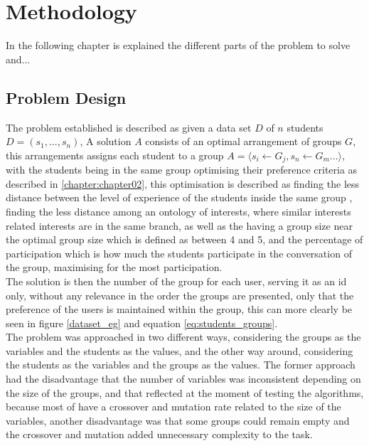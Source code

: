 \chapter{Methodology}
\label{chapter:chapter03}

In the following chapter is explained the different parts of the problem to solve and...

\section{Problem Design}

The problem established is described as given a data set $D$ of $n$ students $D = (s_1,...,s_n)$, A solution $A$ consists of an optimal arrangement of groups $G$, this arrangements assigns each student to a group $A = \langle s_i \leftarrow G_j, s_n \leftarrow G_m...  \rangle$, with the students being in the same group optimising their preference criteria as described in \ref{chapter:chapter02}, this optimisation is described as finding the less distance between the level of experience of the students inside the same group , finding the less distance among an ontology of interests, where similar interests related interests are in the same branch, as well as the having a group size near the optimal group size which is defined as between 4 and 5, and the percentage of participation which is how much the students participate in the conversation of the group, maximising for the most participation.\\

The solution is then the number of the group for each user, serving it as an id only, without any relevance in the order the groups are presented, only that the preference of the users is maintained within the group, this can more clearly be seen in figure \ref{dataset_eg} and equation \ref{eq:students_groups}.\\

The problem was approached in two different ways, considering the groups as the variables and the students as the values, and the other way around, considering the students as the variables and the groups as the values. The former approach had the disadvantage that the number of variables was inconsistent depending on the size of the groups, and that reflected at the moment of testing the algorithms, because most of have a crossover and mutation rate related to the size of the variables, another disadvantage was that some groups could remain empty and the crossover and mutation added unnecessary complexity to the task.\\

